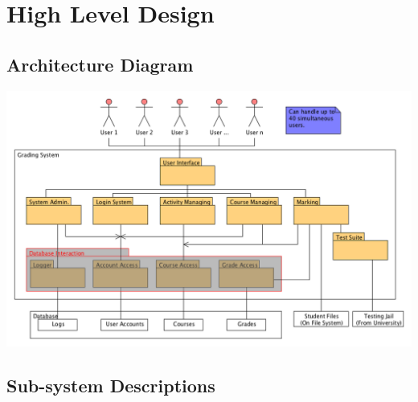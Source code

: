 \documentclass{article}
\begin{document}
\section{High Level Design}
\subsection{Architecture Diagram}
\centerline{\includegraphics[scale=0.55]{../images/architectureDiagram}}

\subsection{Sub-system Descriptions}
\end{document}
